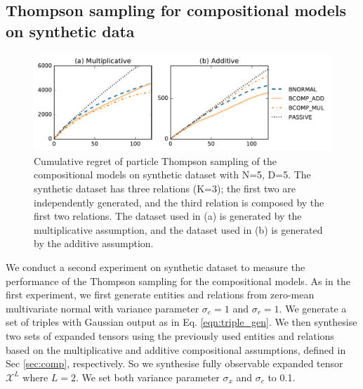 \subsection{Thompson sampling for compositional models on synthetic data}
\begin{figure}[t]
	\centering
	\includegraphics[width=\linewidth]{images/toy_comp_5_2_5.pdf}
	\caption{\label{fig:comp_synthetic} Cumulative regret of particle Thompson sampling of the compositional models on synthetic dataset with N=5, D=5. The synthetic dataset has three relations (K=3); the first two are independently generated, and the third relation is composed by the first two relations. The dataset used in (a) is generated by the multiplicative assumption, and the dataset used in (b) is generated by the additive assumption.}
\end{figure}

We conduct a second experiment on synthetic dataset to measure the 
performance of the Thompson sampling for the compositional models.
As in the first experiment, we first generate entities and relations from 
zero-mean multivariate normal with variance parameter $\sigma_e = 1$ and 
$\sigma_r=1$. We generate a set of triples with Gaussian output as in 
Eq. \ref{eqn:triple_gen}. We then synthesise two sets of expanded tensors 
using the previously used entities and relations based on the multiplicative 
and additive compositional assumptions, defined in Sec \ref{sec:comp}, 
respectively. So we synthesise fully observable expanded tensor $\mathcal{X}^L$ 
where $L=2$. We set both variance parameter $\sigma_x$ and $\sigma_c$ to 0.1.

